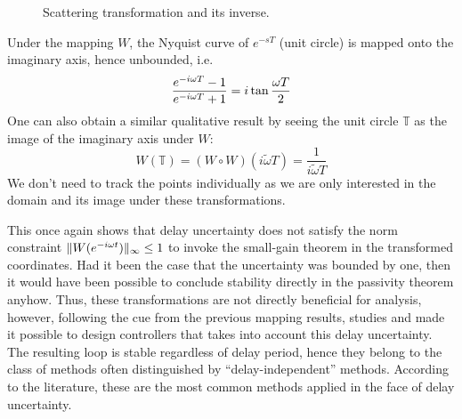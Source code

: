 \begin{figure}%
\centering
{}
\caption[Scattering transformation and its inverse.]{Scattering transformation and its inverse.}%
\label{lit:syn:invscat}%
\end{figure}


Under the mapping $W$, the Nyquist curve of $e^{-sT}$ (unit circle) is mapped onto the imaginary axis, 
hence unbounded, i.e.
\[
\frac{e^{-i\omega T}-1}{e^{-i\omega T}+1} = i\tan{\frac{\omega T}{2}}
\]
One can also obtain a similar qualitative result by seeing the unit circle $\mathbb{T}$ as the image of 
the imaginary axis under $W$: 
\[
W(\mathbb{T}) = (W\circ W)(i\widetilde{\omega} T) = \frac{1}{i\widetilde{\omega} T}
\]
We don't need to track the points individually as we are only interested in the domain and its image
under these transformations. 


This once again shows that delay uncertainty does not satisfy the norm constraint
$\|W(e^{-i\omega t})\|_\infty \leq 1$ to invoke the small-gain theorem in the transformed coordinates. 
Had it been the case that the uncertainty was bounded by one, then it would have been possible to 
conclude stability directly in the passivity theorem anyhow. Thus, these transformations are not directly 
beneficial for analysis, however, following the cue from the previous mapping results, studies 
\cite{andersonspong} and \cite{nieslotine} 
made it possible to design controllers that takes into account this delay uncertainty. The resulting 
loop is stable regardless of delay period, hence they belong to the class of methods often distinguished
by \enquote{delay-independent} methods. According to the literature, these are the most common methods
applied in the face of delay uncertainty.

